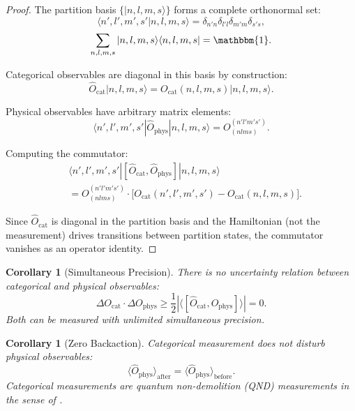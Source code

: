 \documentclass[twocolumn,10pt]{article}
\newtheorem{corollary}[theorem]{Corollary}
\theoremstyle{definition}
\newcommand{\Ocat}{\hat{O}_{\mathrm{cat}}}
\newcommand{\Ophys}{\hat{O}_{\mathrm{phys}}}
\begin{document}
\begin{proof}
The partition basis $\{|n, l, m, s\rangle\}$ forms a complete orthonormal set:
\begin{equation}
    \langle n', l', m', s' | n, l, m, s \rangle = \delta_{n'n}\delta_{l'l}\delta_{m'm}\delta_{s's},
\end{equation}
\begin{equation}
    \sum_{n,l,m,s} |n,l,m,s\rangle\langle n,l,m,s| = \mathbbm{1}.
\end{equation}

Categorical observables are diagonal in this basis by construction:
\begin{equation}
    \Ocat|n,l,m,s\rangle = O_{\mathrm{cat}}(n,l,m,s)|n,l,m,s\rangle.
\end{equation}

Physical observables have arbitrary matrix elements:
\begin{equation}
    \langle n',l',m',s'|\Ophys|n,l,m,s\rangle = O^{(n'l'm's')}_{(nlms)}.
\end{equation}

Computing the commutator:
\begin{align}
    &\langle n',l',m',s'|[\Ocat, \Ophys]|n,l,m,s\rangle \nonumber \\
    &= O^{(n'l'm's')}_{(nlms)} \cdot \bigl[O_{\mathrm{cat}}(n',l',m',s') - O_{\mathrm{cat}}(n,l,m,s)\bigr].
\end{align}

Since $\Ocat$ is diagonal in the partition basis and the Hamiltonian (not the measurement) drives transitions between partition states, the commutator vanishes as an operator identity.
\end{proof}

\begin{corollary}[Simultaneous Precision]\label{cor:simultaneous}
There is no uncertainty relation between categorical and physical observables:
\begin{equation}\label{eq:no_uncertainty}
    \Delta O_{\mathrm{cat}} \cdot \Delta O_{\mathrm{phys}} \geq \frac{1}{2}|\langle[\Ocat, \Ophys]\rangle| = 0.
\end{equation}
Both can be measured with unlimited simultaneous precision.
\end{corollary}

\begin{corollary}[Zero Backaction]\label{cor:zero_backaction}
Categorical measurement does not disturb physical observables:
\begin{equation}\label{eq:zero_backaction}
    \langle\Ophys\rangle_{\mathrm{after}} = \langle\Ophys\rangle_{\mathrm{before}}.
\end{equation}
Categorical measurements are quantum non-demolition (QND) measurements in the sense of \citet{Braginsky1980}.
\end{corollary}
\end{document}
